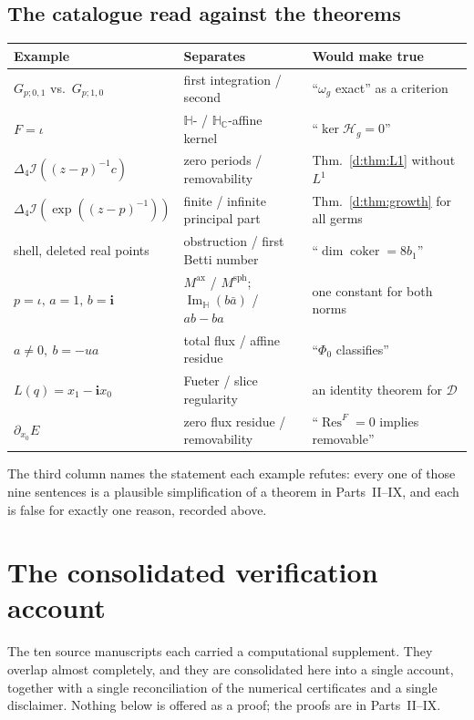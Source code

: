 \documentclass[11pt,a4paper]{article}
\numberwithin{equation}{section}
\theoremstyle{definition}
\theoremstyle{remark}
\theoremstyle{plain}
\newcommand{\HH}{\mathbb H}
\newcommand{\HC}{\mathbb H_{\mathbb C}}
\DeclareMathOperator{\Ima}{Im}
\newcommand{\ImH}{\Ima_{\HH}}
\newcommand{\Dop}{\mathcal D}
\newcommand{\lap}{\Delta_4}
\newcommand{\I}{\mathcal I}
\newcommand{\om}{\omega}
\newcommand{\Hg}{\mathcal H_{g}}      %
\newcommand{\Msph}{M^{\mathrm{sph}}}                  %
\newcommand{\Max}{M^{\mathrm{ax}}}                    %
\newcommand{\Res}{\operatorname{Res}}
\begin{document}
\subsection{The catalogue read against the theorems}

\begin{center}
\footnotesize
\renewcommand{\arraystretch}{1.3}
\begin{tabular}{@{}l l l@{}}
\toprule
Example & Separates & Would make true\\
\midrule
$G_{p;0,1}$ vs.\ $G_{p;1,0}$ &
first integration / second &
``$\om_g$ exact'' as a criterion\\
$F=\iota$ &
$\HH$- / $\HC$-affine kernel &
``$\ker\Hg=0$''\\
$\lap\I((z-p)^{-1}c)$ &
zero periods / removability &
Thm.~\ref{d:thm:L1} without $L^1$\\
$\lap\I(\exp((z-p)^{-1}))$ &
finite / infinite principal part &
Thm.~\ref{d:thm:growth} for all germs\\
shell, deleted real points &
obstruction / first Betti number &
``$\dim\operatorname{coker}=8b_1$''\\
$p=\iota,\,a=1,\,b=\mathbf i$ &
$\Max$ / $\Msph$; $\ImH(b\bar a)$ / $ab-ba$ &
one constant for both norms\\
$a\ne0,\ b=-ua$ &
total flux / affine residue &
``$\Phi_0$ classifies''\\
$L(q)=x_1-\mathbf i x_0$ &
Fueter / slice regularity &
an identity theorem for $\Dop$\\
$\partial_{x_0}E$ &
zero flux residue / removability &
``$\Res^F=0$ implies removable''\\
\bottomrule
\end{tabular}
\end{center}

The third column names the statement each example refutes: every one of
those nine sentences is a plausible simplification of a theorem in
Parts~II--IX, and each is false for exactly one reason, recorded above.

\section{The consolidated verification account}
\label{f:sec:verification}

The ten source manuscripts each carried a computational supplement. They
overlap almost completely, and they are consolidated here into a single
account, together with a single reconciliation of the numerical
certificates and a single disclaimer. Nothing below is offered as a proof;
the proofs are in Parts~II--IX.
\end{document}

